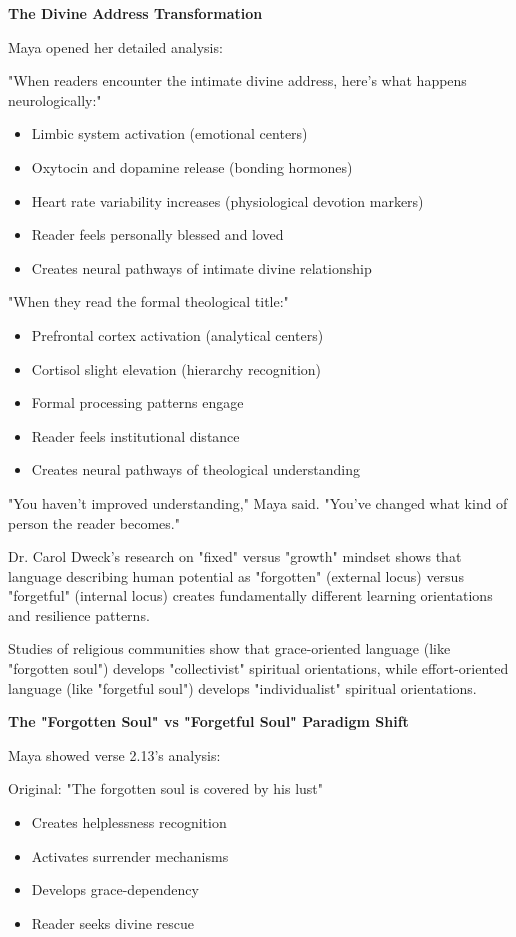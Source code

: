 \documentclass[11pt,twoside]{book}
\begin{document}
\textbf{\textbf{The Divine Address Transformation}}

Maya opened her detailed analysis:

"When readers encounter the intimate divine address, here's what happens neurologically:"
\begin{itemize}
\item Limbic system activation (emotional centers)
\item Oxytocin and dopamine release (bonding hormones)
\item Heart rate variability increases (physiological devotion markers)
\item Reader feels personally blessed and loved
\item Creates neural pathways of intimate divine relationship
\end{itemize}

"When they read the formal theological title:"
\begin{itemize}
\item Prefrontal cortex activation (analytical centers)
\item Cortisol slight elevation (hierarchy recognition)
\item Formal processing patterns engage
\item Reader feels institutional distance
\item Creates neural pathways of theological understanding
\end{itemize}

"You haven't improved understanding," Maya said. "You've changed what kind of person the reader becomes."

Dr. Carol Dweck's research on "fixed" versus "growth" mindset shows that language describing human potential as "forgotten" (external locus) versus "forgetful" (internal locus) creates fundamentally different learning orientations and resilience patterns.

Studies of religious communities show that grace-oriented language (like "forgotten soul") develops "collectivist" spiritual orientations, while effort-oriented language (like "forgetful soul") develops "individualist" spiritual orientations.

\textbf{\textbf{The "Forgotten Soul" vs "Forgetful Soul" Paradigm Shift}}

Maya showed verse 2.13's analysis:

Original: "The forgotten soul is covered by his lust"
\begin{itemize}
\item Creates helplessness recognition
\item Activates surrender mechanisms
\item Develops grace-dependency
\item Reader seeks divine rescue
\end{itemize}
\end{document}
